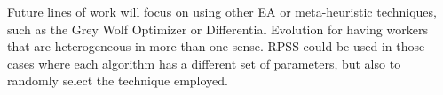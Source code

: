 \documentclass[sigconf]{acmart}
\begin{document}
Future lines of work will focus on using other EA or 
meta-heuristic techniques, such as the Grey Wolf Optimizer \cite{mirjalili2014grey}
or Differential Evolution \cite{storn1997differential} for having workers that are 
heterogeneous in more than one sense. RPSS could be used 
in those cases where each algorithm has a different set of 
parameters, but also to randomly select the technique employed. 


 

\clearpage %
\end{document}
